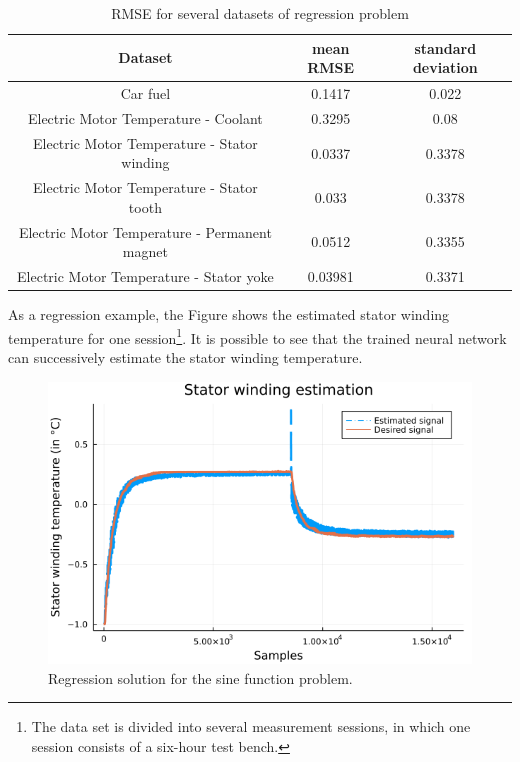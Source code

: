 \documentclass[12pt,a4paper]{article}
\begin{document}
\begin{table}[H]
	\centering
	\caption{RMSE for several datasets of regression problem}
	\footnotesize
	\setlength{\tabcolsep}{5pt}
	\begin{tabular}{ccc}
		\hline
		Dataset & mean RMSE & standard deviation \\
		\hline
		Car fuel & 0.1417 & 0.022 \\
        \hline
		Electric Motor Temperature - Coolant & 0.3295 & 0.08 \\
		\hline
		Electric Motor Temperature - Stator winding & 0.0337 & 0.3378 \\
		\hline
        Electric Motor Temperature - Stator tooth & 0.033 & 0.3378 \\
		\hline
        Electric Motor Temperature - Permanent magnet & 0.0512 & 0.3355 \\
		\hline
        Electric Motor Temperature - Stator yoke & 0.03981 & 0.3371 \\
		\hline
	\end{tabular} \label{tab:rmse-regression-results}
\end{table}

As a regression example, the Figure shows the estimated stator winding temperature for one session\footnote{The data set is divided into several measurement sessions, in which one session consists of a six-hour test bench.}. It is possible to see that the trained neural network can successively estimate the stator winding temperature.

\begin{figure}[H]
    \centering
    \includegraphics[scale=.4]{../trab5 (MLP)/figs/electric-motor-temp - Stator winding regression.png}
    \caption{Regression solution for the sine function problem.}
    \label{fig:sine-regression}
\end{figure}
\end{document}
